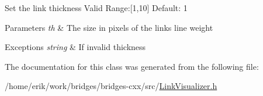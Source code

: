 Set the link thickness Valid Range\+:\mbox{[}1,10\mbox{]} Default\+: 1


\begin{DoxyParams}{Parameters}
{\em th} & The size in pixels of the link\textquotesingle{}s line weight \\
\hline
\end{DoxyParams}

\begin{DoxyExceptions}{Exceptions}
{\em string} & If invalid thickness \\
\hline
\end{DoxyExceptions}


The documentation for this class was generated from the following file\+:\begin{DoxyCompactItemize}
\item 
/home/erik/work/bridges/bridges-\/cxx/src/\hyperlink{_link_visualizer_8h}{Link\+Visualizer.\+h}\end{DoxyCompactItemize}
